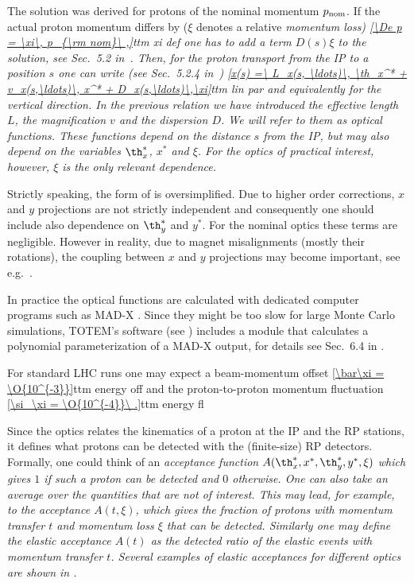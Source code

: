 The solution  was derived for protons of the nominal momentum $p_{\rm nom}$. If the actual proton momentum differs by ($\xi$ denotes a relative \em{momentum loss})
\eqref{\De p = \xi\, p_{\rm nom}\ ,}{ttm xi def}
one has to add a term $D(s) \xi$ to the solution, see Sec.~5.2 in~. Then, for the proton transport from the IP to a position $s$ one can write (see Sec.~5.2.4 in~)
\eqref{x(s) =\ L_x(s, \ldots)\, \th_x^* + v_x(s,\ldots)\, x^* + D_x(s,\ldots)\,\xi}{ttm lin par}
and equivalently for the vertical direction. In the previous relation we have introduced the \em{effective length} $L$, the \em{magnification} $v$ and the \em{dispersion} $D$. We will refer to them as \em{optical functions}. These functions depend on the distance $s$ from the IP, but may also depend on the variables $\th_x^*$, $x^*$ and $\xi$. For the optics of practical interest, however, $\xi$ is the only relevant dependence.

Strictly speaking, the form of  is oversimplified. Due to higher order corrections, $x$ and $y$ projections are not strictly independent and consequently one should include also dependence on $\th_y^*$ and $y^*$. For the nominal optics these terms are negligible. However in reality, due to magnet misalignments (mostly their rotations), the coupling between $x$ and $y$ projections may become important, see e.g.~.

In practice the optical functions are calculated with dedicated computer programs such as MAD-X . Since they might be too slow for large Monte Carlo simulations, TOTEM's software (see ) includes a module that calculates a polynomial parameterization of a MAD-X output, for details see Sec.~6.4 in .

For standard LHC runs one may expect a beam-momentum offset
\eqref{\bar\xi = \O{10^{-3}}}{ttm energy off}
and the proton-to-proton momentum fluctuation
\eqref{\si_\xi = \O{10^{-4}}\ .}{ttm energy fl}

Since the optics  relates the kinematics of a proton at the IP and the RP stations, it defines what protons can be detected with the (finite-size) RP detectors. Formally, one could think of an \em{acceptance} function $A(\th_x^*, x^*, \th_y^*, y^*, \xi)$ which gives $1$ if such a proton can be detected and $0$ otherwise. One can also take an average over the quantities that are not of interest. This may lead, for example, to the acceptance $A(t, \xi)$, which gives the fraction of protons with momentum transfer $t$ and momentum loss $\xi$ that can be detected. Similarly one may define the \em{elastic acceptance} $A(t)$ as the detected ratio of the elastic events with momentum transfer $t$. Several examples of elastic acceptances for different optics are shown in .


